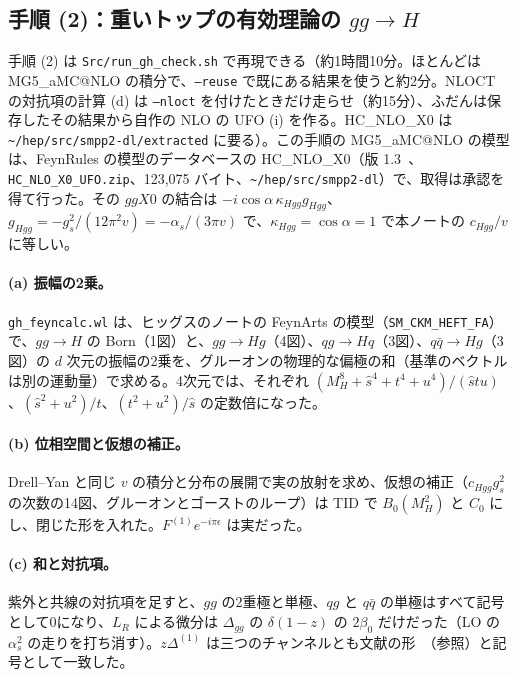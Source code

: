 \documentclass[a4paper,10pt]{ltjsarticle}
\makeatletter
\newcommand{\MGaMC}{MG5\_aMC@NLO}
\makeatother
\begin{document}
\subsection{手順 (2)：重いトップの有効理論の $gg\to H$}\label{sec:step2}

手順 (2) は \texttt{Src/run\_gh\_check.sh} で再現できる（約1時間10分。ほとんどは \MGaMC{} の積分で、\texttt{--reuse} で既にある結果を使うと約2分。NLOCT の対抗項の計算 (d) は \texttt{--nloct} を付けたときだけ走らせ（約15分）、ふだんは保存したその結果から自作の NLO の UFO (i) を作る。HC\_NLO\_X0 は \nolinkurl{~/hep/src/smpp2-dl/extracted} に要る）。この手順の \MGaMC{} の模型は、FeynRules の模型のデータベースの HC\_NLO\_X0（版 1.3~\cite{hcnlo}、\texttt{HC\_NLO\_X0\_UFO.zip}、123{,}075 バイト、\nolinkurl{~/hep/src/smpp2-dl}）で、取得は承認を得て行った。その $ggX0$ の結合は $-i\cos\alpha\,\kappa_{Hgg}g_{Hgg}$、$g_{Hgg}=-g_s^2/(12\pi^2v)=-\alpha_s/(3\pi v)$ で、$\kappa_{Hgg}=\cos\alpha=1$ で本ノートの $c_{Hgg}/v$ に等しい。

\paragraph{(a) 振幅の2乗。}\texttt{gh\_feyncalc.wl} は、ヒッグスのノートの FeynArts の模型（\texttt{SM\_CKM\_HEFT\_FA}）で、$gg\to H$ の Born（1図）と、$gg\to Hg$（4図）、$qg\to Hq$（3図）、$q\bar q\to Hg$（3図）の $d$ 次元の振幅の2乗を、グルーオンの物理的な偏極の和（基準のベクトルは別の運動量）で求める。4次元では、それぞれ $(M_H^8+\hat s^4+t^4+u^4)/(\hat stu)$、$(\hat s^2+u^2)/t$、$(t^2+u^2)/\hat s$ の定数倍になった。

\paragraph{(b) 位相空間と仮想の補正。}Drell--Yan と同じ $v$ の積分と分布の展開で実の放射を求め、仮想の補正（$c_{Hgg}g_s^2$ の次数の14図、グルーオンとゴーストのループ）は TID で $B_0(M_H^2)$ と $C_0$ にし、閉じた形を入れた。$F^{(1)}e^{-i\pi\epsilon}$ は実だった。

\paragraph{(c) 和と対抗項。}紫外と共線の対抗項を足すと、$gg$ の2重極と単極、$qg$ と $q\bar q$ の単極はすべて記号として0になり、$L_R$ による微分は $\Delta_{gg}$ の $\delta(1-z)$ の $2\beta_0$ だけだった（LO の $\alpha_s^2$ の走りを打ち消す）。$z\Delta^{(1)}$ は三つのチャンネルとも文献の形~\cite{dawson91,dsz91,hk02}（参照）と記号として一致した。
\end{document}

